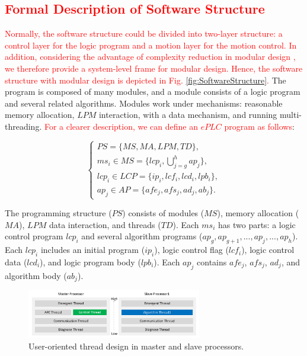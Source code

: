 \documentclass[journal,UTF8]{IEEEtran}
\begin{document}
	\subsection{\textcolor{red}{Formal Description of Software Structure}}  
	\textcolor{red}{Normally, the software structure could be divided into two-layer structure: a control layer for the logic program and a motion layer for the motion control. In addition, considering the advantage of complexity reduction in modular design \cite{Vyatkin2013Software}, we therefore provide a system-level frame for modular design. Hence, the software structure with modular design is depicted in Fig. \ref{fig:SoftwareStructure}.} The program is composed of many modules, and a module consists of a logic program and several related algorithms. Modules work under mechanisms: reasonable memory allocation, $LPM$ interaction, with a data mechanism, and running multi-threading. \textcolor{red}{For a clearer description, we can define an $ePLC$ program as follows}:
	
	\begin{equation}
	\left\{
	\begin{array}{l}
	PS = \{MS, MA , LPM, TD\},\\
	ms_i \in MS = \{lcp_i, \bigcup_{j=g}^h ap_j\},\\
	lcp_i \in LCP = \{ip_i, lcf_i, lcd_i, lpb_i\},\\
	ap_j \in AP = \{afe_j, afs_j, ad_j, ab_j\}.
	\end{array}
	\right.
	\end{equation}
	
	The programming structure ($PS$) consists of modules ($MS$), memory allocation ($MA$), $LPM$ data interaction, and threads ($TD$). Each $ms_i$ has two parts: a logic control program $lcp_i$ and several algorithm programs ($ap_g, ap_{g+1},..., ap_{j},..., ap_{h}$). Each $lcp_i$ includes an initial program ($ip_i$), logic control flag ($lcf_i$), logic control data ($lcd_i$), and logic program body ($lpb_i$). Each $ap_{j}$ contains $afe_{j}$, $afs_{j}$, $ad_{j}$, and algorithm body ($ab_{j}$).
	
	\begin{figure}
		\centering
		\includegraphics[width=3in]{fig/FIG5.pdf}
		\caption{ User-oriented thread design in master and slave processors.}
		\label{fig:Threads}
	\end{figure}
\end{document}
